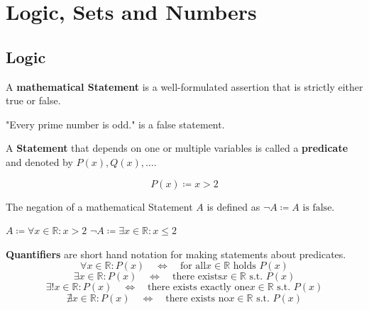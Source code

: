 \section{Logic, Sets and Numbers}

\subsection{Logic}

\begin{definition}
    A \textbf{mathematical Statement} is a well-formulated assertion that is strictly either true or false.
\end{definition}

\begin{example}
    "Every prime number is odd." is a false statement.
\end{example}

\begin{definition}
A \textbf{Statement} that depends on one or multiple variables is called a \textbf{predicate} and denoted by $P(x), Q(x), \dots$.
\end{definition}

\begin{example}
$$P(x) \coloneqq x > 2$$
\end{example}

\begin{definition}
    The negation of a mathematical Statement $A$ is defined as $\neg A \coloneqq A \text{ is false}$.
\end{definition}

\begin{example}
    $A \coloneqq \forall x \in \mathbb{R}: x > 2$
    $\neg A \coloneqq \exists x \in \mathbb{R}: x \leq 2$
\end{example}

\begin{definition}
    \textbf{Quantifiers} are short hand notation for making statements about predicates.
    $$\forall x \in \mathbb{R}: P(x) \quad \iff \quad \text{for all} x \in \mathbb{R} \text{ holds } P(x)$$
    $$\exists x \in \mathbb{R}: P(x) \quad \iff \quad \text{there exists} x \in \mathbb{R} \text{ s.t. } P(x)$$
    $$\exists ! x \in \mathbb{R}: P(x) \quad \iff \quad \text{there exists exactly one} x \in \mathbb{R} \text{ s.t. } P(x)$$
    $$\nexists x \in \mathbb{R}: P(x) \quad \iff \quad \text{there exists no} x \in \mathbb{R} \text{ s.t. } P(x)$$
\end{definition}

